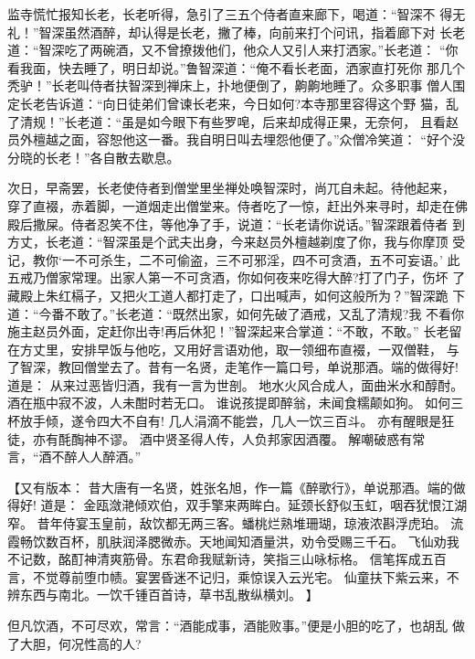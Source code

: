 监寺慌忙报知长老，长老听得，急引了三五个侍者直来廊下，喝道：“智深不
得无礼！”智深虽然酒醉，却认得是长老，撇了棒，向前来打个问讯，指着廊下对
长老道：“智深吃了两碗酒，又不曾撩拨他们，他众人又引人来打洒家。”长老道：
“你看我面，快去睡了，明日却说。”鲁智深道：“俺不看长老面，洒家直打死你
那几个秃驴！”长老叫侍者扶智深到禅床上，扑地便倒了，齁齁地睡了。众多职事
僧人围定长老告诉道：“向日徒弟们曾谏长老来，今日如何?本寺那里容得这个野
猫，乱了清规！”长老道：“虽是如今眼下有些罗唣，后来却成得正果，无奈何，
且看赵员外檀越之面，容恕他这一番。我自明日叫去埋怨他便了。”众僧冷笑道：
“好个没分晓的长老！”各自散去歇息。

次日，早斋罢，长老使侍者到僧堂里坐禅处唤智深时，尚兀自未起。待他起来，
穿了直裰，赤着脚，一道烟走出僧堂来。侍者吃了一惊，赶出外来寻时，却走在佛
殿后撒屎。侍者忍笑不住，等他净了手，说道：“长老请你说话。”智深跟着侍者
到方丈，长老道：“智深虽是个武夫出身，今来赵员外檀越剃度了你，我与你摩顶
受记，教你‘一不可杀生，二不可偷盗，三不可邪淫，四不可贪酒，五不可妄语。’
此五戒乃僧家常理。出家人第一不可贪酒，你如何夜来吃得大醉?打了门子，伤坏
了藏殿上朱红槅子，又把火工道人都打走了，口出喊声，如何这般所为？”智深跪
下道：“今番不敢了。”长老道：“既然出家，如何先破了酒戒，又乱了清规?我
不看你施主赵员外面，定赶你出寺!再后休犯！”智深起来合掌道：“不敢，不敢。”
长老留在方丈里，安排早饭与他吃，又用好言语劝他，取一领细布直裰，一双僧鞋，
与了智深，教回僧堂去了。昔有一名贤，走笔作一篇口号，单说那酒。端的做得好!
道是：
从来过恶皆归酒，我有一言为世剖。
地水火风合成人，面曲米水和醇酎。
酒在瓶中寂不波，人未酣时若无口。
谁说孩提即醉翁，未闻食糯颠如狗。
如何三杯放手倾，遂令四大不自有!
几人涓滴不能尝，几人一饮三百斗。
亦有醒眼是狂徒，亦有酕醄神不谬。
酒中贤圣得人传，人负邦家因酒覆。
解嘲破惑有常言，“酒不醉人人醉酒。”

【又有版本：
昔大唐有一名贤，姓张名旭，作一篇《醉歌行》，单说那酒。端的做得好!
道是：
金瓯潋滟倾欢伯，双手擎来两眸白。延颈长舒似玉虹，咽吞犹恨江湖窄。
昔年侍宴玉皇前，敌饮都无两三客。蟠桃烂熟堆珊瑚，琼液浓斟浮虎珀。
流霞畅饮数百杯，肌肤润泽腮微赤。天地闻知酒量洪，劝令受赐三千石。
飞仙劝我不记数，酩酊神清爽筋骨。东君命我赋新诗，笑指三山咏标格。
信笔挥成五百言，不觉尊前堕巾帻。宴罢昏迷不记归，乘惊误入云光宅。
仙童扶下紫云来，不辨东西与南北。一饮千锺百首诗，草书乱散纵横刘。
】

但凡饮酒，不可尽欢，常言：“酒能成事，酒能败事。”便是小胆的吃了，也胡乱
做了大胆，何况性高的人?

